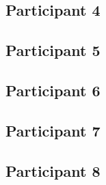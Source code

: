 \subsection{Participant 4}\label{sec:p4}
\subsection{Participant 5}\label{sec:p5}
\subsection{Participant 6}\label{sec:p6}
\subsection{Participant 7}\label{sec:p7}
\subsection{Participant 8}\label{sec:p8}